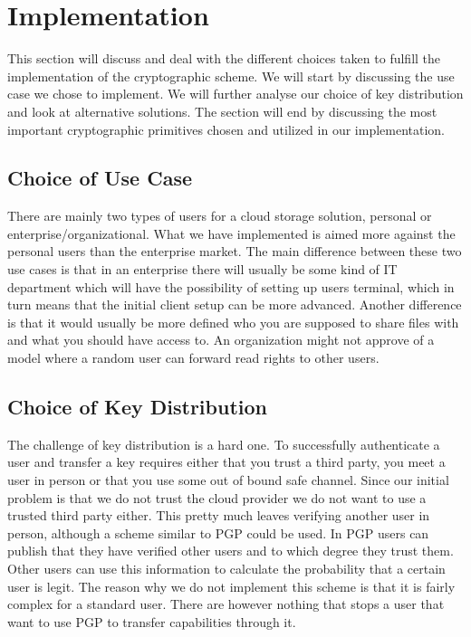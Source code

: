 \documentclass[pdftex,english,10pt,b5paper,twoside]{book}
\begin{document}
\section{Implementation}
\label{sec:DIS:impl}

This section will discuss and deal with the different choices taken to fulfill
the implementation of the cryptographic scheme. We will start by discussing the
use case we chose to implement. We will further analyse our choice of key
distribution and look at alternative solutions. The section will end by
discussing the most important cryptographic primitives chosen and utilized in
our implementation.

\subsection{Choice of Use Case}

There are mainly two types of users for a cloud storage solution, personal or
enterprise/organizational. What we have implemented is aimed more against the
personal users than the enterprise market. The main difference between these
two use cases is that in an enterprise there will usually be some kind of IT
department which will have the possibility of setting up users terminal, which
in turn means that the initial client setup can be more advanced. Another
difference is that it would usually be more defined who you are supposed to
share files with and what you should have access to. An organization might not
approve of a model where a random user can forward read rights to other users.

\subsection{Choice of Key Distribution}
\label{sec:DI:keydist}

The challenge of key distribution is a hard one. To successfully authenticate a
user and transfer a key requires either that you trust a third party, you meet
a user in person or that you use some out of bound safe channel. Since our
initial problem is that we do not trust the cloud provider we do not want to
use a trusted third party either. This pretty much leaves verifying another
user in person, although a scheme similar to \ac{PGP} could be used. In
\ac{PGP} users can publish that they have verified other users and to which
degree they trust them. Other users can use this information to calculate the
probability that a certain user is legit. The reason why we do not implement this
scheme is that it is fairly complex for a standard user. There are however
nothing that stops a user that want to use \ac{PGP} to transfer capabilities
through it.
\end{document}
